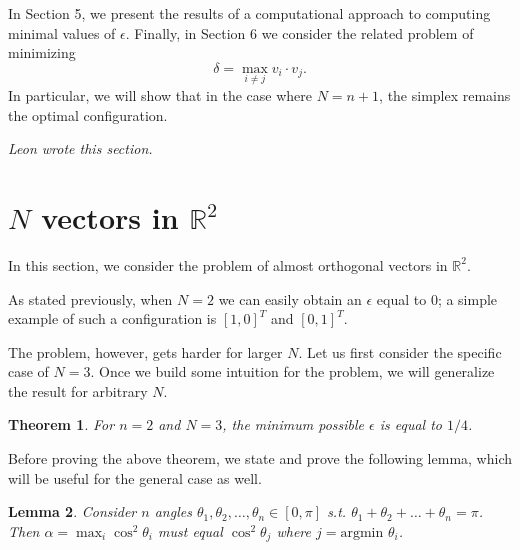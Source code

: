 \documentclass[11pt,letterpaper,twoside,english]{article}
\theoremstyle{theorem}
\newtheorem{theorem}{Theorem}[section]
\newtheorem{lemma}[theorem]{Lemma}
\theoremstyle{remark}
\providecommand{\R}{\mathbb{R}}
\begin{document}
In Section 5, we present the results of a computational approach to computing minimal values of $\epsilon$. Finally, in Section 6 we consider the related problem of minimizing 
\[\delta=\max_{i\neq j}v_i\cdot v_j.\]
In particular, we will show that in the case where $N=n+1$, the simplex remains the optimal configuration.


{\itshape Leon wrote this section.}
\section{$N$ vectors in $\R^2$}
In this section, we consider the problem of almost orthogonal vectors in $\R^2$.

As stated previously, when $N=2$ we can easily obtain an $\epsilon$ equal to $0$; a simple example of such a configuration is $[1, 0]^T$ and $[0, 1]^T$. 

The problem, however, gets harder for larger $N$. Let us first consider the specific case of $N=3$. Once we build some intuition for the problem, we will generalize the result for arbitrary $N$.

\begin{theorem}
For $n=2$ and $N=3$, the minimum possible $\epsilon$ is equal to $1/4$.
\end{theorem}

Before proving the above theorem, we state and prove the following lemma, which will be useful for the general case as well.

\begin{lemma}
Consider $n$ angles $\theta_1, \theta_2, \ldots, \theta_n \in [0, \pi]$ s.t. $\theta_1 + \theta_2 + \ldots + \theta_n = \pi$. Then $\alpha = \max_i \cos^2 \theta_i$ must equal $\cos^2 \theta_j$ where $j = \text{argmin }\theta_i$.
\end{lemma}
\end{document}
